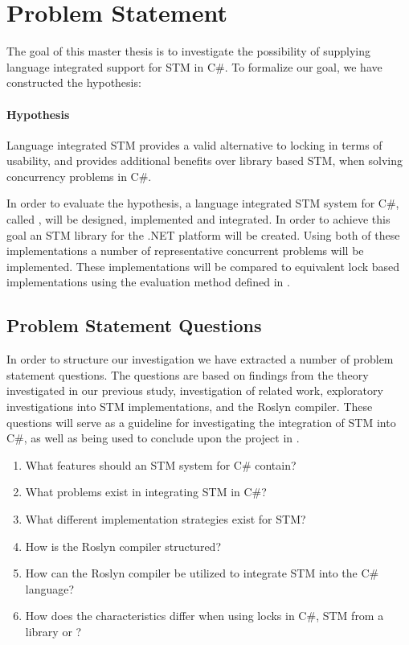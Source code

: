 \section{Problem Statement}\label{sec:problem_statement}
The goal of this master thesis is to investigate the possibility of supplying language integrated support for \ac{STM} in C\#. To formalize our goal, we have constructed the hypothesis:

\paragraph{Hypothesis} Language integrated \ac{STM} provides a valid alternative to locking in terms of usability, and provides additional benefits over library based \ac{STM}, when solving concurrency problems in C\#. 

In order to evaluate the hypothesis, a language integrated \ac{STM} system for C\#, called \stmname, will be designed, implemented and integrated. In order to achieve this goal an \ac{STM} library for the .NET platform will be created. Using both of these implementations a number of representative concurrent problems will be implemented. These implementations will be compared to equivalent lock based implementations using the evaluation method defined in .

\subsection{Problem Statement Questions}
In order to structure our investigation we have extracted a number of problem statement questions. The questions are based on findings from the theory investigated in our previous study\cite{dpt907e14trending}, investigation of related work, exploratory investigations into \ac{STM} implementations, and the Roslyn compiler. These questions will serve as a guideline for investigating the integration of \ac{STM} into C\#, as well as being used to conclude upon the project in .

\begin{enumerate}
\item What features should an \ac{STM} system for C\# contain?
\item What problems exist in integrating \ac{STM} in C\#?
\item What different implementation strategies exist for \ac{STM}?
\item How is the Roslyn compiler structured?
\item How can the Roslyn compiler be utilized to integrate \ac{STM} into the C\# language?
\item How does the characteristics differ when using locks in C\#, \ac{STM} from a library or \stmname?
\end{enumerate}

